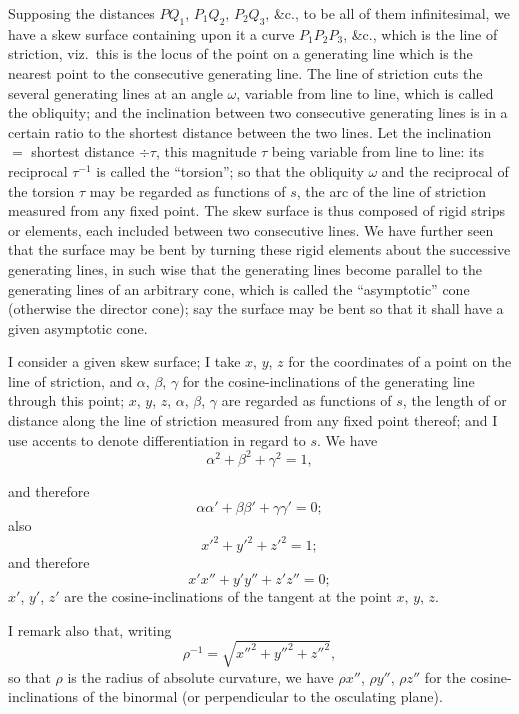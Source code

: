 \documentclass[11pt,a4paper]{article}
\begin{document}
Supposing the distances $PQ_1$, $P_1 Q_2$, $P_2 Q_3$, \&c., to be all of them infinitesimal, we have a skew surface containing upon it a curve $P_1 P_2 P_3$, \&c., which is the line of striction, viz.\ this is the locus of the point on a generating line which is the nearest point to the consecutive generating line. The line of striction cuts the several generating lines at an angle $\omega$, variable from line to line, which is called the obliquity; and the inclination between two consecutive generating lines is in a certain ratio to the shortest distance between the two lines. Let the inclination $=$ shortest distance $\div \tau$, this magnitude $\tau$ being variable from line to line: its reciprocal $\tau^{-1}$ is called the ``torsion''; so that the obliquity $\omega$ and the reciprocal of the torsion $\tau$ may be regarded as functions of $s$, the arc of the line of striction measured from any fixed point. The skew surface is thus composed of rigid strips or elements, each included between two consecutive lines. We have further seen that the surface may be bent by turning these rigid elements about the successive generating lines, in such wise that the generating lines become parallel to the generating lines of an arbitrary cone, which is called the ``asymptotic'' cone (otherwise the director cone); say the surface may be bent so that it shall have a given asymptotic cone.

I consider a given skew surface; I take $x$, $y$, $z$ for the coordinates of a point on the line of striction, and $\alpha$, $\beta$, $\gamma$ for the cosine-inclinations of the generating line through this point; $x$, $y$, $z$, $\alpha$, $\beta$, $\gamma$ are regarded as functions of $s$, the length of or distance along the line of striction measured from any fixed point thereof; and I use accents to denote differentiation in regard to $s$. We have
\[
\alpha^2 + \beta^2 + \gamma^2 = 1,
\]

and therefore
\[
\alpha\alpha' + \beta\beta' + \gamma\gamma' = 0;
\]
also
\[
x'^2 + y'^2 + z'^2 = 1;
\]
and therefore
\[
x' x'' + y' y'' + z' z'' = 0;
\]
$x'$, $y'$, $z'$ are the cosine-inclinations of the tangent at the point $x$, $y$, $z$.

I remark also that, writing
\[
\rho^{-1} = \sqrt{x''^2 + y''^2 + z''^2},
\]
so that $\rho$ is the radius of absolute curvature, we have $\rho x''$, $\rho y''$, $\rho z''$ for the cosine-inclinations of the binormal (or perpendicular to the osculating plane).
\end{document}
